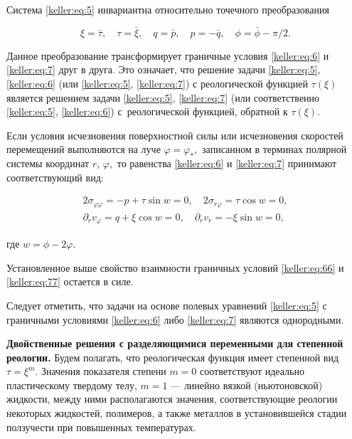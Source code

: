 Система \eqref{keller:eq:5} инвариантна относительно точечного преобразования

\begin{equation}\label{keller:eq:8}

\xi = \bar{\tau} ,\quad  \tau = \bar{\xi} ,\quad  q = \bar{p},\quad  p = -\bar{q},\quad  \phi = \bar{\phi}-{\pi}/{2}.

\end{equation}

Данное преобразование трансформирует граничные условия \eqref{keller:eq:6} и \eqref{keller:eq:7} друг в друга. Это означает, что решение задачи \eqref{keller:eq:5}, \eqref{keller:eq:6} (или \eqref{keller:eq:5}, \eqref{keller:eq:7}) с реологической функцией $\tau(\xi)$ является решением задачи \eqref{keller:eq:5}, \eqref{keller:eq:7} (или соответственно \eqref{keller:eq:5}, \eqref{keller:eq:6}) с~реологической функцией, обратной к $\tau(\xi).$ 



Если условия исчезновения поверхностной силы или исчезновения скоростей перемещений выполняются на луче $\varphi=\varphi_{\ast},$ записанном в терминах полярной системы координат $r$, $\varphi,$ то равенства \eqref{keller:eq:6} и \eqref{keller:eq:7} принимают соответствующий вид:

\begin{gather}\label{keller:eq:66}

	2\sigma_{\varphi\varphi}=-p+\tau\sin w=0,\quad 2\sigma_{r\varphi}=\tau\cos w=0,

\\

\label{keller:eq:77}

	\partial_r v_{\varphi} =q+\xi\cos w=0,\quad \partial_r v_r=-\xi\sin w=0,

\end{gather} 

где $w=\phi-2\varphi$. 

Установленное выше свойство взаимности граничных условий \eqref{keller:eq:66} и \eqref{keller:eq:77} остается в силе.



Следует отметить, что задачи на основе полевых уравнений \eqref{keller:eq:5} с граничными условиями \eqref{keller:eq:6} либо \eqref{keller:eq:7} являются однородными.



\smallskip



{\bf Двойственные решения с разделяющимися переменными для степенной реологии.} Будем полагать, что реологическая функция имеет степенной вид $\tau=\xi^m.$  Значения показателя степени $m=0$ соответствуют идеально пластическому твердому телу, $m=1$ --- линейно вязкой (ньютоновской) жидкости, между ними располагаются значения, соответствующие реологии некоторых жидкостей, полимеров, а также металлов в установившейся стадии ползучести при повышенных температурах. 



